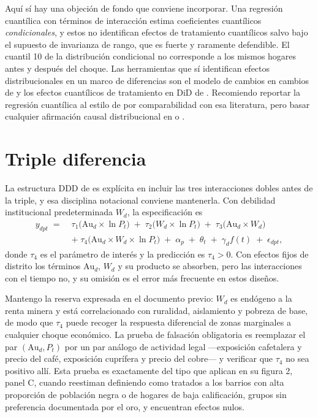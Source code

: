 \documentclass[11pt,a4paper]{article}
\newcommand{\Au}{\mathrm{Au}}
\begin{document}
Aquí sí hay una objeción de fondo que conviene incorporar. Una regresión cuantílica con términos de interacción estima coeficientes cuantílicos \emph{condicionales}, y estos no identifican efectos de tratamiento cuantílicos salvo bajo el supuesto de invarianza de rango, que es fuerte y raramente defendible. El cuantil 10 de la distribución condicional no corresponde a los mismos hogares antes y después del choque. Las herramientas que sí identifican efectos distribucionales en un marco de diferencias son el modelo de cambios en cambios de \citet{athey2006} y los efectos cuantílicos de tratamiento en DiD de \citet{callawayli2019}. Recomiendo reportar la regresión cuantílica al estilo de \citet{pecastaing2020} por comparabilidad con esa literatura, pero basar cualquier afirmación causal distribucional en \citet{athey2006} o \citet{callawayli2019}.

\section{Triple diferencia}

La estructura DDD de \citet{pecastaing2020} es explícita en incluir las tres interacciones dobles antes de la triple, y esa disciplina notacional conviene mantenerla. Con debilidad institucional predeterminada $W_d$, la especificación es
\begin{align}
y_{dpt} \;=\;& \tau_1\bigl(\Au_d \times \ln P_t\bigr) \;+\; \tau_2\bigl(W_d \times \ln P_t\bigr) \;+\; \tau_3\bigl(\Au_d \times W_d\bigr) \nonumber\\
&+\; \tau_{4}\bigl(\Au_d \times W_d \times \ln P_t\bigr) \;+\; \alpha_p \;+\; \theta_t \;+\; \gamma_d f(t) \;+\; \epsilon_{dpt},
\label{eq:ddd}
\end{align}
donde $\tau_4$ es el parámetro de interés y la predicción es $\tau_4 > 0$. Con efectos fijos de distrito los términos $\Au_d$, $W_d$ y su producto se absorben, pero las interacciones con el tiempo no, y su omisión es el error más frecuente en estos diseños.

Mantengo la reserva expresada en el documento previo: $W_d$ es endógeno a la renta minera y está correlacionado con ruralidad, aislamiento y pobreza de base, de modo que $\tau_4$ puede recoger la respuesta diferencial de zonas marginales a cualquier choque económico. La prueba de falsación obligatoria es reemplazar el par $(\Au_d, P_t)$ por un par análogo de actividad legal ---exposición cafetalera y precio del café, exposición cuprífera y precio del cobre--- y verificar que $\tau_4$ no sea positivo allí. Esta prueba es exactamente del tipo que \citet{braakmann2024} aplican en su figura 2, panel C, cuando reestiman definiendo como tratados a los barrios con alta proporción de población negra o de hogares de baja calificación, grupos sin preferencia documentada por el oro, y encuentran efectos nulos.
\end{document}
